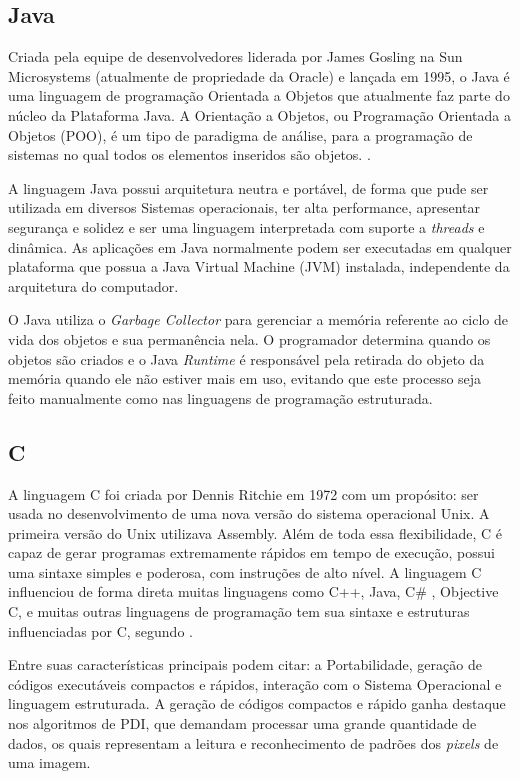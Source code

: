 \subsection{Java}
Criada pela equipe de desenvolvedores liderada por James Gosling na Sun Microsystems (atualmente de propriedade da Oracle) e lançada em 1995, o Java é uma linguagem de programação Orientada a Objetos que atualmente faz parte do núcleo da Plataforma Java. A Orientação a Objetos, ou Programação Orientada a Objetos (POO), é um tipo de paradigma de análise, para a programação de sistemas no qual todos os elementos inseridos são objetos. \cite{urma2014java}.

A linguagem Java possui arquitetura neutra e portável, de forma que pude ser utilizada em diversos Sistemas operacionais, ter alta performance, apresentar segurança e solidez e ser uma linguagem interpretada com suporte a \textit{threads} e dinâmica. As aplicações em Java normalmente podem ser executadas em qualquer plataforma que possua a Java Virtual Machine (JVM) instalada, independente da arquitetura do computador.

O Java utiliza o \textit{Garbage Collector} para gerenciar a memória referente ao ciclo de vida dos objetos e sua permanência nela. O programador determina quando os objetos são criados e o Java \textit{Runtime} é responsável pela retirada do objeto da memória quando ele não estiver mais em uso, evitando que este processo seja feito manualmente como nas linguagens de programação estruturada.

\subsection{C}
A linguagem C foi criada por Dennis Ritchie em 1972 com um propósito: ser usada no desenvolvimento de uma nova versão do sistema operacional Unix. A primeira versão do Unix utilizava Assembly. Além de toda essa flexibilidade, C é capaz de gerar programas extremamente rápidos em tempo de execução, possui uma sintaxe simples e poderosa, com instruções de alto nível. A linguagem C influenciou de forma direta muitas linguagens como C++, Java, C\# , Objective C, e muitas outras linguagens de programação tem sua sintaxe e estruturas influenciadas por C, segundo .

Entre suas características principais podem citar: a Portabilidade, geração de códigos executáveis compactos e rápidos, interação com o Sistema Operacional e linguagem estruturada. A geração de códigos compactos e rápido ganha destaque nos algoritmos de PDI, que demandam processar uma grande quantidade de dados, os quais representam a leitura e reconhecimento de padrões dos \textit{pixels} de uma imagem.


